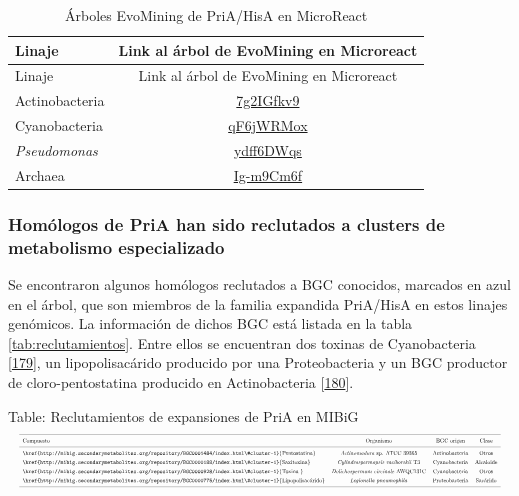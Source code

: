 \documentclass[12pt,twoside]{reedthesis}
\begin{document}
  \begin{longtable}[]{@{}lc@{}}
  \caption{Árboles EvoMining de PriA/HisA en MicroReact
  \label{tab:arboles}}\tabularnewline
  \toprule
  Linaje & Link al árbol de EvoMining en Microreact\tabularnewline
  \midrule
  \endfirsthead
  \toprule
  Linaje & Link al árbol de EvoMining en Microreact\tabularnewline
  \midrule
  \endhead
  Actinobacteria &
  \href{https://microreact.org/project/7g2IGfkv9}{7g2IGfkv9}\tabularnewline
  Cyanobacteria &
  \href{https://microreact.org/project/qF6jWRMox}{qF6jWRMox}\tabularnewline
  \emph{Pseudomonas} &
  \href{https://microreact.org/project/ydff6DWqs}{ydff6DWqs}\tabularnewline
  Archaea &
  \href{https://microreact.org/project/Ig-m9Cm6f}{Ig-m9Cm6f}\tabularnewline
  \bottomrule
  \end{longtable}
  
  \subsubsection{Homólogos de PriA han sido reclutados a clusters de
  metabolismo
  especializado}\label{homologos-de-pria-han-sido-reclutados-a-clusters-de-metabolismo-especializado}
  
  Se encontraron algunos homólogos reclutados a BGC conocidos, marcados en
  azul en el árbol, que son miembros de la familia expandida PriA/HisA en
  estos linajes genómicos. La información de dichos BGC está listada en la
  tabla \autoref{tab:reclutamientos}. Entre ellos se encuentran dos
  toxinas de Cyanobacteria
  {[}\protect\hyperlink{ref-moustafa_origin_2009}{179}{]}, un
  lipopolisacárido producido por una Proteobacteria y un BGC productor de
  cloro-pentostatina producido en Actinobacteria
  {[}\protect\hyperlink{ref-gao_biosynthesis_2017}{180}{]}.
  
  Table: Reclutamientos de expansiones de PriA en MIBiG
  \label{tab:reclutamientos}\\
  \[
  \resizebox{\columnwidth}{!}{%
  \begin{tabular}{ l c c c}
  \hline \\ [-1.5ex]  
  Compuesto & Organismo & BGC origen & Clase \\ [1ex]  
  \hline \\ [-1.5ex]
  \href{http://mibig.secondarymetabolites.org/repository/BGC0001484/index.html\#cluster-1}{Pentostatina}&\textit{Actinomadura} sp. ATCC 39365&Actinobacteria& Otros     \\ [1ex]  
  \href{http://mibig.secondarymetabolites.org/repository/BGC0000188/index.html\#cluster-1}{Saxitoxina}&\textit{Cylindrospermopsis~raciborskii} T3&Cyanobacteria&Alcaloide \\ [1ex]  
  \href{http://mibig.secondarymetabolites.org/repository/BGC0000928/index.html\#cluster-1}{Toxina }&\textit{Dolichospermum~circinale} AWQC131C & Cyanobacteria & Otros    \\ [1ex]  
  \href{http://mibig.secondarymetabolites.org/repository/BGC0000775/index.html\#cluster-1}{Lipopolisacárido}  &\textit{Legionella~pneumophila}    & Proteobacteria & Sac\'arido    \\ [1ex]  
  \hline
  \end{tabular}}
  \] \normalsize
  
\end{document}
